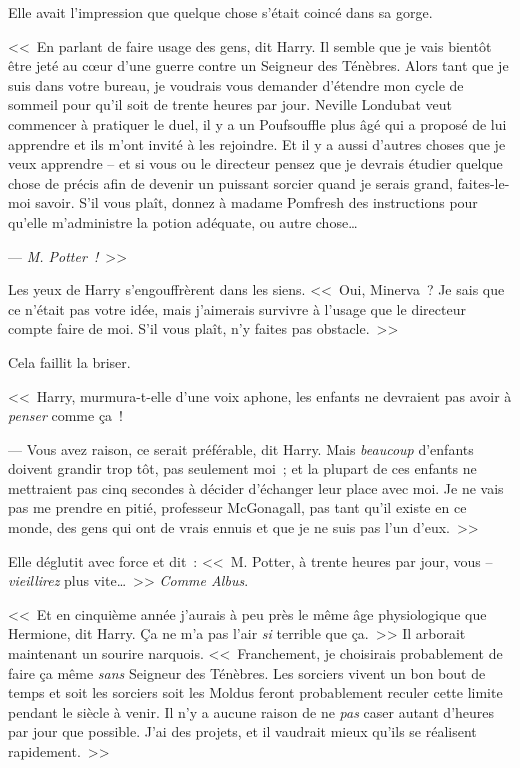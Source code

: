 Elle avait l'impression que quelque chose s'était coincé dans sa gorge.

<<~En parlant de faire usage des gens, dit Harry. Il semble que je vais bientôt être jeté au cœur d'une guerre contre un Seigneur des Ténèbres. Alors tant que je suis dans votre bureau, je voudrais vous demander d'étendre mon cycle de sommeil pour qu'il soit de trente heures par jour. Neville Londubat veut commencer à pratiquer le duel, il y a un Poufsouffle plus âgé qui a proposé de lui apprendre et ils m'ont invité à les rejoindre. Et il y a aussi d'autres choses que je veux apprendre -- et si vous ou le directeur pensez que je devrais étudier quelque chose de précis afin de devenir un puissant sorcier quand je serais grand, faites-le-moi savoir. S'il vous plaît, donnez à madame Pomfresh des instructions pour qu'elle m'administre la potion adéquate, ou autre chose…

--- \emph{M. Potter~!}~>>

Les yeux de Harry s'engouffrèrent dans les siens. <<~Oui, Minerva~? Je sais que ce n'était pas votre idée, mais j'aimerais survivre à l'usage que le directeur compte faire de moi. S'il vous plaît, n'y faites pas obstacle.~>>

Cela faillit la briser.

<<~Harry, murmura-t-elle d'une voix aphone, les enfants ne devraient pas avoir à \emph{penser} comme ça~!

--- Vous avez raison, ce serait préférable, dit Harry. Mais \emph{beaucoup} d'enfants doivent grandir trop tôt, pas seulement moi~; et la plupart de ces enfants ne mettraient pas cinq secondes à décider d'échanger leur place avec moi. Je ne vais pas me prendre en pitié, professeur McGonagall, pas tant qu'il existe en ce monde, des gens qui ont de vrais ennuis et que je ne suis pas l'un d'eux.~>>

Elle déglutit avec force et dit~: <<~M. Potter, à trente heures par jour, vous -- \emph{vieillirez} plus vite…~>> \emph{Comme Albus}.

<<~Et en cinquième année j'aurais à peu près le même âge physiologique que Hermione, dit Harry. Ça ne m'a pas l'air \emph{si} terrible que ça.~>> Il arborait maintenant un sourire narquois. <<~Franchement, je choisirais probablement de faire ça même \emph{sans} Seigneur des Ténèbres. Les sorciers vivent un bon bout de temps et soit les sorciers soit les Moldus feront probablement reculer cette limite pendant le siècle à venir. Il n'y a aucune raison de ne \emph{pas} caser autant d'heures par jour que possible. J'ai des projets, et il vaudrait mieux qu'ils se réalisent rapidement.~>>


